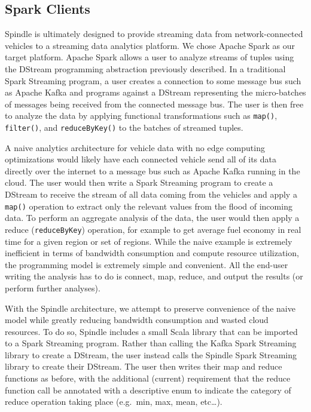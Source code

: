 \documentclass{thesis}
\begin{document}
\subsection{Spark Clients}
    Spindle is ultimately designed to provide streaming data from network-connected vehicles to a streaming data
    analytics platform. We chose Apache Spark as our target platform. Apache Spark allows a user to analyze
    streams of tuples using the DStream programming abstraction previously described. In a traditional Spark
    Streaming program, a user creates a connection to some message bus such as Apache Kafka and programs against
    a DStream representing the micro-batches of messages being received from the connected message bus. The user
    is then free to analyze the data by applying functional transformations such as \verb|map()|, \verb|filter()|, and \verb|reduceByKey()|
    to the batches of streamed tuples. 
    
    A naive analytics architecture for vehicle data with no edge computing optimizations
    would likely have each connected vehicle send all of its data directly over the internet to a message bus such as
    Apache Kafka running in the cloud. The user would then write a Spark Streaming program to create a DStream
    to receive the stream of all data coming from the vehicles and apply a \verb|map()| operation to extract only the 
    relevant values from the flood of incoming data. To perform an aggregate analysis of the data, the user would then
    apply a reduce (\verb|reduceByKey|) operation, for example to get average fuel economy in real time for a given region or set of
    regions. While the naive example is extremely inefficient in terms of bandwidth consumption and compute resource
    utilization, the programming model is extremely simple and convenient. All the end-user writing the analysis
    has to do is connect, map, reduce, and output the results (or perform further analyses). 

    With the Spindle architecture, we attempt to preserve convenience of the naive model while greatly reducing
    bandwidth consumption and wasted cloud resources. To do so, Spindle includes a small Scala library that can be
    imported to a Spark Streaming program. Rather than calling the Kafka Spark Streaming library to create a 
    DStream, the user instead calls the Spindle Spark Streaming library to create their DStream. The user then
    writes their map and reduce functions as before, with the additional (current) requirement that the reduce function
    call be annotated with a descriptive enum to indicate the category of reduce operation taking place (e.g.\ min,
    max, mean, etc\dots).%
\end{document}
